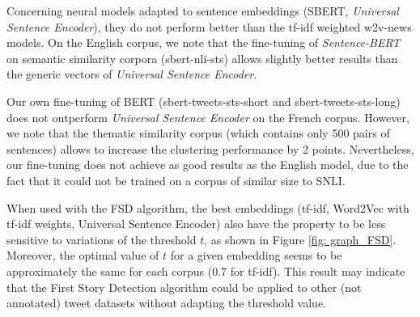 Concerning neural models adapted to sentence embeddings (SBERT, \textit{Universal Sentence Encoder}), they do not perform better than the tf-idf weighted w2v-news models. On the English corpus, we note that the fine-tuning of \textit{Sentence-BERT} on semantic similarity corpora (sbert-nli-sts) allows slightly better results than the generic vectors of \textit{Universal Sentence Encoder}.

Our own fine-tuning of BERT (sbert-tweets-sts-short and sbert-tweets-sts-long) does not outperform \textit{Universal Sentence Encoder} on the French corpus. However, we note that the thematic similarity corpus (which contains only 500 pairs of sentences) allows to increase the clustering performance by 2 points. Nevertheless, our fine-tuning does not achieve as good results as the English model, due to the fact that it could not be trained on a corpus of similar size to SNLI.

When used with the FSD algorithm, the 
best embeddings (tf-idf, Word2Vec with tf-idf weights,
Universal Sentence Encoder) also have the property to be
less sensitive to variations of the threshold $t$, as shown in
Figure \ref{fig: graph_FSD}. Moreover, the optimal value of $t$ for a
given embedding seems to be approximately the same for
each corpus (0.7 for tf-idf). This result may indicate that
the First Story Detection algorithm could be applied to
other (not annotated) tweet datasets without adapting the
threshold value.

